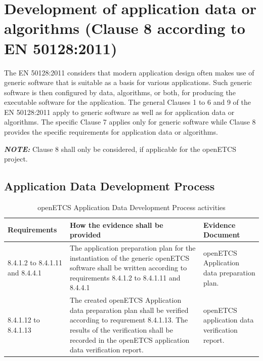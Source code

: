 \documentclass{template/openetcs_report}
\begin{document}
\section{Development of application data or algorithms (Clause 8 according to EN 50128:2011)}
\label{clause82}
\begin{flushleft}
The EN 50128:2011 considers that modern application design often makes use of generic software that is suitable as a basis for various applications. Such generic software is then configured by data, algorithms, or both, for producing the executable software for the application. The general Clauses 1 to 6 and 9 of the EN 50128:2011 apply to generic software as well as for application data or algorithms. The specific Clause 7 applies only for generic software while Clause 8 provides the specific requirements for application data or algorithms.
\end{flushleft}
\begin{flushleft}
\textit{\textbf{NOTE: }}
Clause 8 shall only be considered, if applicable for the openETCS project.
\end{flushleft}
\subsection{Application Data Development Process}
{\footnotesize\sffamily\centering
\begin{longtable}{|p{2cm}|p{9cm}|p{3cm}|}
\caption{openETCS Application Data Development Process activities}\\
\hline
\bfseries Requirements & \bfseries How the evidence shall be provided & \bfseries Evidence Document\\
\hline
\hline
\endhead
\hline
\endfoot

8.4.1.2 to 8.4.1.11 and 8.4.4.1 & The application preparation plan for the instantiation of the generic openETCS software shall be written according to requirements 8.4.1.2 to 8.4.1.11 and 8.4.4.1
& openETCS Application data preparation plan.\\ 
\hline
8.4.1.12 to 8.4.1.13 & The created openETCS Application data preparation plan shall be verified according to requrement 8.4.1.13.
The results of the verification shall be recorded in the openETCS application data verification report. & openETCS application data verification report.\\ 
\hline
\end{longtable}}
\end{document}
